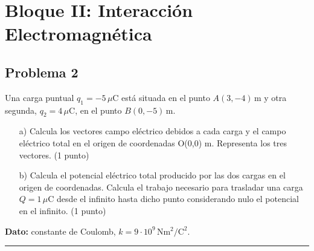 \newpage


\section{Bloque II: Interacción Electromagnética}
\label{sec:em_2022_jul_ord}

\subsection{Problema 2}
\label{subsec:P2_2022_jul_ord}

\begin{cajaenunciado}
Una carga puntual $q_1 = -5\,\mu\text{C}$ está situada en el punto $A(3, -4)\,\text{m}$ y otra segunda, $q_2 = 4\,\mu\text{C}$, en el punto $B(0, -5)\,\text{m}$.
\begin{enumerate}
    \item[a)] Calcula los vectores campo eléctrico debidos a cada carga y el campo eléctrico total en el origen de coordenadas O(0,0) m. Representa los tres vectores. (1 punto)
    \item[b)] Calcula el potencial eléctrico total producido por las dos cargas en el origen de coordenadas. Calcula el trabajo necesario para trasladar una carga $Q = 1\,\mu\text{C}$ desde el infinito hasta dicho punto considerando nulo el potencial en el infinito. (1 punto)
\end{enumerate}
\textbf{Dato:} constante de Coulomb, $k=9\cdot10^{9}\,\text{N}\text{m}^2/\text{C}^2$.
\end{cajaenunciado}
\hrule

